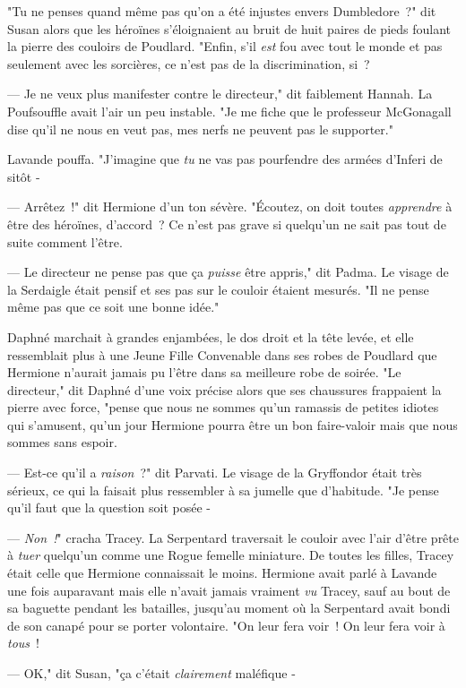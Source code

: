 "Tu ne penses quand même pas qu'on a été injustes envers Dumbledore~?" dit Susan alors que les héroïnes s'éloignaient au bruit de huit paires de pieds foulant la pierre des couloirs de Poudlard. "Enfin, s'il \emph{est} fou avec tout le monde et pas seulement avec les sorcières, ce n'est pas de la discrimination, si~?

--- Je ne veux plus manifester contre le directeur," dit faiblement Hannah. La Poufsouffle avait l'air un peu instable. "Je me fiche que le professeur McGonagall dise qu'il ne nous en veut pas, mes nerfs ne peuvent pas le supporter."

Lavande pouffa. "J'imagine que \emph{tu} ne vas pas pourfendre des armées d'Inferi de sitôt -

--- Arrêtez~!" dit Hermione d'un ton sévère. "Écoutez, on doit toutes \emph{apprendre} à être des héroïnes, d'accord~? Ce n'est pas grave si quelqu'un ne sait pas tout de suite comment l'être.

--- Le directeur ne pense pas que ça \emph{puisse} être appris," dit Padma. Le visage de la Serdaigle était pensif et ses pas sur le couloir étaient mesurés. "Il ne pense même pas que ce soit une bonne idée."

Daphné marchait à grandes enjambées, le dos droit et la tête levée, et elle ressemblait plus à une Jeune Fille Convenable dans ses robes de Poudlard que Hermione n'aurait jamais pu l'être dans sa meilleure robe de soirée. "Le directeur," dit Daphné d'une voix précise alors que ses chaussures frappaient la pierre avec force, "pense que nous ne sommes qu'un ramassis de petites idiotes qui s'amusent, qu'un jour Hermione pourra être un bon faire-valoir mais que nous sommes sans espoir.

--- Est-ce qu'il a \emph{raison}~?" dit Parvati. Le visage de la Gryffondor était très sérieux, ce qui la faisait plus ressembler à sa jumelle que d'habitude. "Je pense qu'il faut que la question soit posée -

--- \emph{Non~!}" cracha Tracey. La Serpentard traversait le couloir avec l'air d'être prête à \emph{tuer} quelqu'un comme une Rogue femelle miniature. De toutes les filles, Tracey était celle que Hermione connaissait le moins. Hermione avait parlé à Lavande une fois auparavant mais elle n'avait jamais vraiment \emph{vu} Tracey, sauf au bout de sa baguette pendant les batailles, jusqu'au moment où la Serpentard avait bondi de son canapé pour se porter volontaire. "On leur fera voir~! On leur fera voir à \emph{tous}~!

--- OK," dit Susan, "ça c'était \emph{clairement} maléfique -

